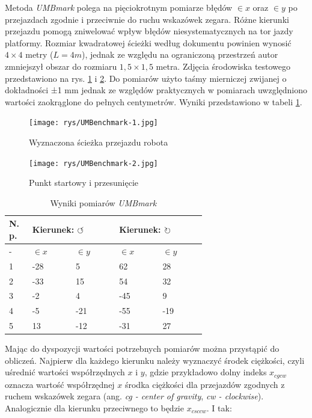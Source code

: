 Metoda \emph{UMBmark} polega na pięciokrotnym pomiarze błędów $\in{x}$ oraz $\in{y}$ po przejazdach zgodnie i przeciwnie do ruchu wskazówek zegara. Różne kierunki przejazdu pomogą zniwelować wpływ błędów niesystematycznych na tor jazdy platformy. Rozmiar kwadratowej ścieżki według dokumentu powinien wynosić $4\times4$ metry ($L=4m$), jednak ze względu na ograniczoną przestrzeń autor zmniejszył obszar do rozmiaru $1,5\times1,5$ metra. Zdjęcia środowiska testowego przedstawiono na rys. \ref{fig:umbenchmark-photo-path} i  \ref{fig:umbenchmark-photo-finish}. Do pomiarów użyto taśmy mierniczej zwijanej o dokładności ±1 mm jednak ze względów praktycznych w pomiarach uwzględniono wartości zaokrąglone do pełnych centymetrów. Wyniki przedstawiono w tabeli \ref{tab:umbmark}.

\begin{figure}[ht]
	\centering
		\texttt{[image: rys/UMBenchmark-1.jpg]}
	\caption{Wyznaczona ścieżka przejazdu robota}
    \label{fig:umbenchmark-photo-path}
\end{figure}

\begin{figure}[ht]
	\centering
		\texttt{[image: rys/UMBenchmark-2.jpg]}
	\caption{Punkt startowy i przesunięcie}
    \label{fig:umbenchmark-photo-finish}
\end{figure}


\begin{table}[H]
    \caption{Wyniki pomiarów \emph{UMBmark}}
     \label{tab:umbmark}
    \centering
    \begin{tabular}{ |p{0.05\linewidth}|p{0.15\linewidth}|p{0.15\linewidth}|p{0.15\linewidth}|p{0.15\linewidth}| } \hline
    N. p. & \multicolumn{2}{p{0.15\linewidth}|}{Kierunek: $\circlearrowleft$} & \multicolumn{2}{p{0.15\linewidth}|}{Kierunek: $\circlearrowright$} \\ \hline
    - & $\in{x}$ & $\in{y}$ & $\in{x}$ & $\in{y}$ \\ \hline \hline
    1 & -28 & 5 & 62 & 28 \\ \hline
    2 & -33 & 15 & 54 & 32 \\ \hline
    3 & -2 & 4 & -45 & 9 \\ \hline
    4 & -5 & -21 & -55 & -19 \\ \hline
    5 & 13 & -12 & -31 & 27 \\ \hline
\end{tabular}
\end{table}

Mając do dyspozycji wartości potrzebnych pomiarów można przystąpić do obliczeń. Najpierw dla każdego kierunku należy wyznaczyć środek ciężkości, czyli uśrednić wartości współrzędnych $x$ i $y$, gdzie przykładowo dolny indeks $x_{cgcw}$ oznacza wartość współrzędnej $x$ środka ciężkości dla przejazdów zgodnych z ruchem wskazówek zegara (ang. \emph{cg - center of gravity}, \emph{cw - clockwise}). Analogicznie dla kierunku przeciwnego to będzie $x_{csccw}$. I tak:

